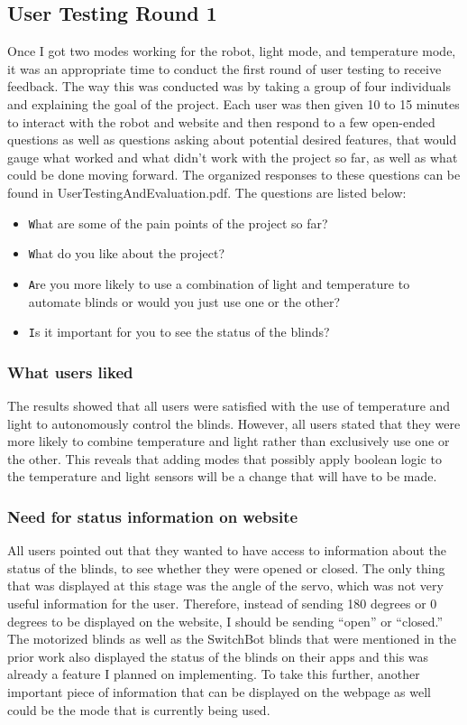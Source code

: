 \documentclass[10pt,twocolumn]{article}
\begin{document}
\subsection{User Testing Round 1}
Once I got two modes working for the robot, light mode, and temperature mode, it was an appropriate time to conduct the first round of user testing to receive feedback. The way this was conducted was by taking a group of four individuals and explaining the goal of the project. Each user was then given 10 to 15 minutes to interact with the robot and website and then respond to a few open-ended questions as well as questions asking about potential desired features, that would gauge what worked and what didn’t work with the project so far, as well as what could be done moving forward. The organized responses to these questions can be found in UserTestingAndEvaluation.pdf. The questions are listed below:

\begin{itemize}
    \item \texttt What are some of the pain points of the project so far?
    \item \texttt What do you like about the project?
    \item \texttt Are you more likely to use a combination of light and temperature to automate blinds or would you just use one or the other?
    \item \texttt Is it important for you to see the status of the blinds?
\end{itemize}

\subsubsection{What users liked}
The results showed that all users were satisfied with the use of temperature and light to autonomously control the blinds. However, all users stated that they were more likely to combine temperature and light rather than exclusively use one or the other. This reveals that adding modes that possibly apply boolean logic to the temperature and light sensors will be a change that will have to be made.

\subsubsection{Need for status information on website}
All users pointed out that they wanted to have access to information about the status of the blinds, to see whether they were opened or closed. The only thing that was displayed at this stage was the angle of the servo, which was not very useful information for the user. Therefore, instead of sending 180 degrees or 0 degrees to be displayed on the website, I should be sending “open” or “closed.” The motorized blinds as well as the SwitchBot blinds that were mentioned in the prior work also displayed the status of the blinds on their apps and this was already a feature I planned on implementing. To take this further, another important piece of information that can be displayed on the webpage as well could be the mode that is currently being used.
\end{document}
